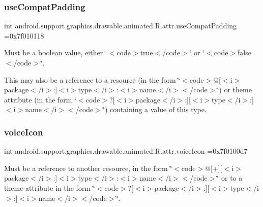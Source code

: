 \subsubsection{\texorpdfstring{use\+Compat\+Padding}{useCompatPadding}}
{\footnotesize\ttfamily int android.\+support.\+graphics.\+drawable.\+animated.\+R.\+attr.\+use\+Compat\+Padding =0x7f010118\hspace{0.3cm}{\ttfamily [static]}}

Must be a boolean value, either \char`\"{}$<$code$>$true$<$/code$>$\char`\"{} or \char`\"{}$<$code$>$false$<$/code$>$\char`\"{}. 

This may also be a reference to a resource (in the form \char`\"{}$<$code$>$@\mbox{[}$<$i$>$package$<$/i$>$\+:\mbox{]}$<$i$>$type$<$/i$>$\+:$<$i$>$name$<$/i$>$$<$/code$>$\char`\"{}) or theme attribute (in the form \char`\"{}$<$code$>$?\mbox{[}$<$i$>$package$<$/i$>$\+:\mbox{]}\mbox{[}$<$i$>$type$<$/i$>$\+:\mbox{]}$<$i$>$name$<$/i$>$$<$/code$>$\char`\"{}) containing a value of this type. \mbox{\label{classandroid_1_1support_1_1graphics_1_1drawable_1_1animated_1_1R_1_1attr_acdf60e4a92fa30ceeeb49f25b08a128d}} 
\subsubsection{\texorpdfstring{voice\+Icon}{voiceIcon}}
{\footnotesize\ttfamily int android.\+support.\+graphics.\+drawable.\+animated.\+R.\+attr.\+voice\+Icon =0x7f0100d7\hspace{0.3cm}{\ttfamily [static]}}

Must be a reference to another resource, in the form \char`\"{}$<$code$>$@\mbox{[}+\mbox{]}\mbox{[}$<$i$>$package$<$/i$>$\+:\mbox{]}$<$i$>$type$<$/i$>$\+:$<$i$>$name$<$/i$>$$<$/code$>$\char`\"{} or to a theme attribute in the form \char`\"{}$<$code$>$?\mbox{[}$<$i$>$package$<$/i$>$\+:\mbox{]}\mbox{[}$<$i$>$type$<$/i$>$\+:\mbox{]}$<$i$>$name$<$/i$>$$<$/code$>$\char`\"{}. \mbox{\label{classandroid_1_1support_1_1graphics_1_1drawable_1_1animated_1_1R_1_1attr_a52a2f5e65e54f9b6f0690329a0b49931}} 
